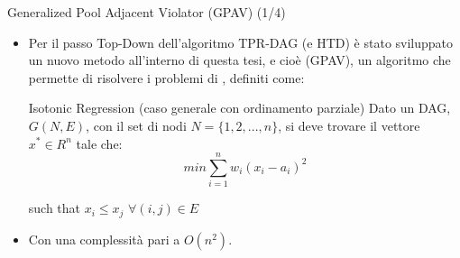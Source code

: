 \documentclass[9pt]{beamer}
\begin{document}
\begin{tframe}{Generalized Pool Adjacent Violator (GPAV) (1/4)}
\begin{itemize}
\item Per il passo Top-Down dell’algoritmo TPR-DAG (e HTD) è stato sviluppato un nuovo metodo all'interno di questa tesi, e cioè  (GPAV), un algoritmo che permette di risolvere i problemi di , definiti come:
\begin{block}{Isotonic Regression (caso generale con ordinamento parziale)}
Dato un DAG, $G(N, E)$, con il set di nodi $N = \{1, 2, ..., n\}$, si deve trovare il vettore $x^{*}\in R^{n}$ tale che:
\[
min \sum_{i=1}^{n} w_i (x_i - a_i)^2
\]
\begin{center}
such that $x_i \le x_j$ $\forall (i,j) \in E $ 
\end{center}
\end{block} 
\item Con una complessità pari a $O(n^2)$.
\end{itemize}
\end{tframe}
\end{document}
